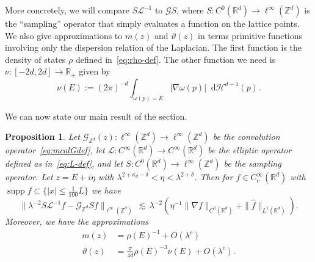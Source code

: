 \documentclass[11pt]{amsart}
\def\Real{{\mathbb R}}
\def\R{{\mathbb{R}}}
\def\bbZ{{\mathbb Z}}
\newcommand{\diff}{\mathop{}\!\mathrm{d}}
\newcommand{\Ft}[1]{{\widehat{#1}}}
\newcommand{\supp}{\operatorname*{supp}}
\def\lsim{{\,\lesssim\,}}
\newcommand{\mcal}[1]{{\mathcal{#1}}}
\numberwithin{equation}{section}
\numberwithin{theorem}{section}
\newtheorem{proposition}[theorem]{Proposition}
\begin{document}
More concretely, we will compare $S\mcal{L}^{-1} $ to  $ \mathcal{G}S$, where $S:C^0(\Real^d)\to \ell^\infty(\bbZ^d)$ is the ``sampling'' operator
that simply evaluates a function on the lattice points.   We also give approximations to $m(z)$ and $\vartheta(z)$ in terms
primitive functions involving only the dispersion relation of the Laplacian. The first function is the density of states $\rho$ defined in~\eqref{eq:rho-def}.
The other function we need is $\nu:[-2d,2d]\to\Real_+$ given by
\begin{equation}
\label{eq:nu-def}
\nu(E) := (2\pi)^{-d}  \int_{\omega(p)=E} |\nabla \omega(p)| \diff\mcal{H}^{d-1}(p).
\end{equation}

We can now state our main result of the section.
\begin{proposition}
\label{prp:elliptic-limit}
Let $\mathcal{G}_{\bbZ^d}(z):\ell^\infty(\bbZ^{d})\to \ell^{\infty}(\bbZ^{d})$ be the convolution operator~\eqref{eq:mcalGdef},
let $\mathcal{L}:C^\infty(\Real^d)\to C^\infty(\Real^d)$  be the
elliptic operator defined as in~\eqref{eq:L-def}, and let $S:C^0(\Real^d)\to \ell^\infty(\bbZ^d)$ be the sampling operator.
Let $z=E+i\eta$ with $\lambda^{2+\kappa_d-\delta} < \eta < \lambda^{2+\delta}$.
Then for $f\in C_c^\infty(\Real^d)$ with $\supp f\subset\{|x|\leq \frac{1}{100}L\}$ we have
\[
\|\lambda^{-2}S \mathcal{L}^{-1} f - \mathcal{G}_{\bbZ^d} S f\|_{\ell^\infty(\bbZ^{d})} \lsim \lambda^{-2} ( \eta^{-1}\|\nabla f\|_{C^0(\R^{d})} + \|\Ft{f}\|_{L^1(\R^{d})}).
\]
Moreover, we have the approximations
\begin{equation}
\begin{split}
\label{eq:massdiff-limit}
m(z) &= \rho(E)^{-1} +  O(\lambda^{c})\\
\vartheta(z) &= \frac{\pi}{4d}\rho(E)^{-3}\nu(E) + O(\lambda^{c}).
\end{split}
\end{equation}
\end{proposition}
\end{document}
